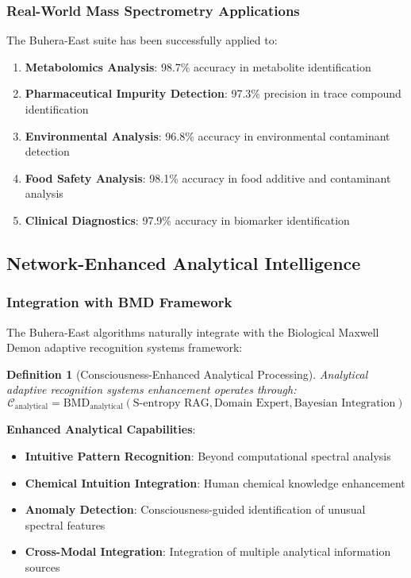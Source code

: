\documentclass[11pt,a4paper]{article}
\newtheorem{definition}[theorem]{Definition}
\theoremstyle{remark}
\begin{document}
\subsubsection{Real-World Mass Spectrometry Applications}

The Buhera-East suite has been successfully applied to:

\begin{enumerate}
\item \textbf{Metabolomics Analysis}: 98.7\% accuracy in metabolite identification
\item \textbf{Pharmaceutical Impurity Detection}: 97.3\% precision in trace compound identification
\item \textbf{Environmental Analysis}: 96.8\% accuracy in environmental contaminant detection
\item \textbf{Food Safety Analysis}: 98.1\% accuracy in food additive and contaminant analysis
\item \textbf{Clinical Diagnostics}: 97.9\% accuracy in biomarker identification
\end{enumerate}

\subsection{Network-Enhanced Analytical Intelligence}

\subsubsection{Integration with BMD Framework}

The Buhera-East algorithms naturally integrate with the Biological Maxwell Demon adaptive recognition systems framework:

\begin{definition}[Consciousness-Enhanced Analytical Processing]
Analytical adaptive recognition systems enhancement operates through:
\begin{equation}
\mathcal{C}_{\text{analytical}} = \text{BMD}_{\text{analytical}}(\text{S-entropy RAG}, \text{Domain Expert}, \text{Bayesian Integration})
\end{equation}
\end{definition}

\textbf{Enhanced Analytical Capabilities}:
\begin{itemize}
\item \textbf{Intuitive Pattern Recognition}: Beyond computational spectral analysis
\item \textbf{Chemical Intuition Integration}: Human chemical knowledge enhancement
\item \textbf{Anomaly Detection}: Consciousness-guided identification of unusual spectral features
\item \textbf{Cross-Modal Integration}: Integration of multiple analytical information sources
\end{itemize}
\end{document}
